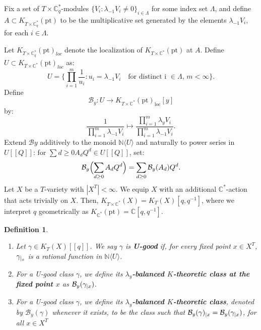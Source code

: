 \documentclass{amsart}
\newtheorem{definition}{Definition}
\begin{document}
Fix a set of $T \times \mathbb{C}^*_q$-modules $\{V_i : \lambda_{-1}V_i \neq 0 \}_{i \in \Lambda}$ for some index set $\Lambda$, and define $A \subset K_{T \times \mathbb{C}^*_q}(\mathrm{pt})$ to be the multiplicative set generated by the elements $\lambda_{-1}V_i$, for each $i \in \Lambda$.

Let $K_{T \times \mathbb{C}^*_q}(\mathrm{pt})_{loc}$ denote the localization of $K_{T \times \mathbb{C}^*}(\mathrm{pt})$ at $A$. Define $U \subset K_{T \times \mathbb{C}^*}(\mathrm{pt})_{loc}$ as:
\[
 U=\{\prod_{i=1}^m\frac{1}{u_i} : u_i =\lambda_{-1}V_i \quad \text{for distinct i $\in \Lambda$, $m < \infty$}\}.
 \]
 Define  
\[
\mathcal{B}_y \colon U \to K_{T \times \mathbb{C}^*}(\mathrm{pt})_{\mathrm{loc}}[y]
\]
 by:
 \[
 \frac{1}{\prod_{i=1}^m\lambda_{-1}V_i} \mapsto  \frac{\prod_{i=1}^m\lambda_{y}V_i}{\prod_{i=1}^m\lambda_{-1}V_i}.
 \]
 Extend $\mathcal{B}y$ additively to the monoid $\mathbb{N}\langle U \rangle$ and naturally to power series in $U[[Q]]$: for $\sum{d \ge 0} A_d Q^d \in U[[Q]]$, set:
 \[
 \mathcal{B}_y\Bigl(\sum_{d \ge 0} A_d Q^d\Bigr) = \sum_{d \ge 0} \mathcal{B}_y(A_d) Q^d.
 \]
 Let $X$ be a $T$-variety with $| X^T| < \infty$. We equip $X$ with an additional $\mathbb{C}^*$-action that acts trivially on $X$. Then, $K_{T \times \mathbb{C}^*}(X) = K_T(X)[q,q^{-1}]$, where we interpret $q$ geometrically as $K_{\mathbb{C}^*}(\mathrm{pt}) = \mathbb{C}[q,q^{-1}]$.

\begin{definition}\label{balancing definitions}
\begin{enumerate}
    \item  Let $\gamma \in K_{T}(X)[[q]]$. We say $\gamma$ is \textbf{U-good} if, for every fixed point $x \in X^T$, $\gamma_{\arrowvert_x}$ is a rational function in $\mathbb{N}\langle U \rangle$.
    \item For a U-good class $\gamma$, we define its {\bf $\lambda_y$-balanced $K$-theoretic class at the fixed point $x$} as $\mathcal{B}_y(\gamma_{{\arrowvert}x})$.
    \item For a U-good class $\gamma$, we define its {\bf $\lambda_y$-balanced $K$-theoretic class}, denoted by $\mathcal{B}_y(\gamma)$ whenever it exists, to be the class such that $\mathcal{B}_y(\gamma)_{{\arrowvert}x} = \mathcal{B}_y(\gamma_{{\arrowvert}x})$, for all $x \in X^T$
    \end{enumerate}
\end{definition}
\end{document}
